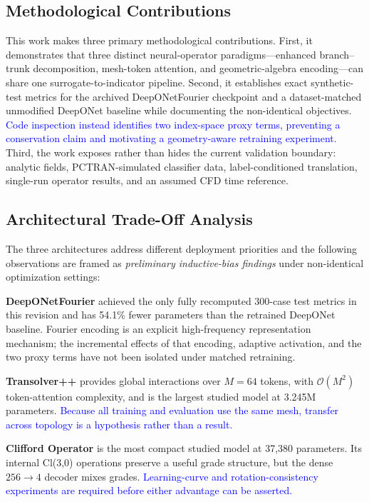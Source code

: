 \documentclass[journal]{IEEEtran}
\newcommand{\added}[1]{\textcolor{blue}{#1}}
\begin{document}
\subsection{Methodological Contributions}

This work makes three primary methodological contributions. First, it demonstrates that three distinct neural-operator paradigms---enhanced branch--trunk decomposition, mesh-token attention, and geometric-algebra encoding---can share one surrogate-to-indicator pipeline. Second, it establishes exact synthetic-test metrics for the archived DeepONetFourier checkpoint and a dataset-matched unmodified DeepONet baseline while documenting the non-identical objectives.  \added{Code inspection instead identifies two index-space proxy terms, preventing a conservation claim and motivating a geometry-aware retraining experiment.} Third, the work exposes rather than hides the current validation boundary: analytic fields, PCTRAN-simulated classifier data, label-conditioned translation, single-run operator results, and an assumed CFD time reference.

\subsection{Architectural Trade-Off Analysis}

The three architectures address different deployment priorities and the following observations are framed as \emph{preliminary inductive-bias findings} under non-identical optimization settings:

\textbf{DeepONetFourier} achieved the only fully recomputed 300-case test metrics in this revision and has 54.1\% fewer parameters than the retrained DeepONet baseline. Fourier encoding is an explicit high-frequency representation mechanism; the incremental effects of that encoding, adaptive activation, and the two proxy terms have not been isolated under matched retraining.

\textbf{Transolver++} provides global interactions over $M=64$ tokens, with $\mathcal{O}(M^2)$ token-attention complexity, and is the largest studied model at 3.245M parameters.  \added{Because all training and evaluation use the same mesh, transfer across topology is a hypothesis rather than a result.}

\textbf{Clifford Operator} is the most compact studied model at 37,380 parameters. Its internal Cl(3,0) operations preserve a useful grade structure, but the dense $256\to4$ decoder mixes grades.  \added{Learning-curve and rotation-consistency experiments are required before either advantage can be asserted.}
\end{document}
